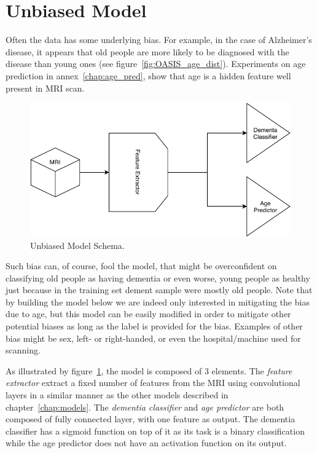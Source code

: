 \section{Unbiased Model}
\label{sec:unbias_model}

Often the data has some underlying bias. For example, in the case of Alzheimer’s disease, it appears that old people are more likely to be diagnosed with the disease than young ones (see figure~\ref{fig:OASIS_age_dist}). Experiments on age prediction in annex~\ref{chap:age_pred}, show that age is a hidden feature well present in MRI scan.

\begin{figure}
 \centering
 \includegraphics[width=.9\linewidth]{figures/models/Unbias_model.pdf}
 \captionsetup{width=.9\linewidth}
 \caption[UnbiasModelSchema]{Unbiased Model Schema.}
 \label{fig:unbias_model_schema}
\end{figure}

Such bias can, of course, fool the model, that might be overconfident on classifying old people as having dementia or even worse, young people as healthy just because in the training set dement sample were mostly old people.
Note that by building the model below we are indeed only interested in mitigating the bias due to age, but this model can be easily modified in order to mitigate other potential biases as long as the label is provided for the bias. Examples of other bias might be sex, left- or right-handed, or even the hospital/machine used for scanning.


As illustrated by figure~\ref{fig:unbias_model_schema}, the model is composed of 3 elements. The \textit{feature extractor} extract a fixed number of features from the MRI using convolutional layers in a similar manner as the other models described in chapter~\ref{chap:models}. The \textit{dementia classifier} and \textit{age predictor} are both composed of fully connected layer, with one feature as output. The dementia classifier has a sigmoid function on top of it as its task is a binary classification while the age predictor does not have an activation function on its output.


